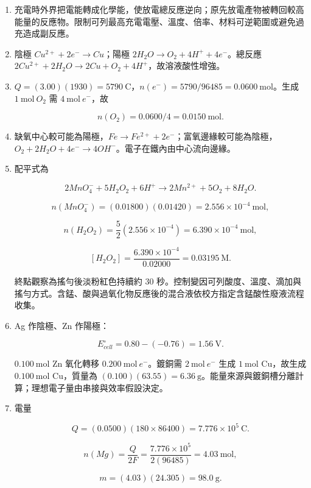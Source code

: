 \documentclass[11pt,a4paper]{article}
\begin{document}
\begin{enumerate}
  \[
  2Fe^{3+}+Cu\rightarrow2Fe^{2+}+Cu^{2+},
  \]

  \[
  E^\circ_{cell}=0.77-0.34=0.43\ \mathrm V.
  \]
\item
  充電時外界把電能轉成化學能，使放電總反應逆向；原先放電產物被轉回較高能量的反應物。限制可列最高充電電壓、溫度、倍率、材料可逆範圍或避免過充造成副反應。
\item
  陰極 \(Cu^{2+}+2e^-\rightarrow Cu\)；陽極 \(2H_2O\rightarrow O_2+4H^++4e^-\)。總反應 \(2Cu^{2+}+2H_2O\rightarrow2Cu+O_2+4H^+\)，故溶液酸性增強。
\item
  \(Q=(3.00)(1930)=5790\ \mathrm C\)，\(n(e^-)=5790/96485=0.0600\ \mathrm{mol}\)。生成 \(1\ \mathrm{mol}\ O_2\) 需 \(4\ \mathrm{mol}\ e^-\)，故

  \[
  n(O_2)=0.0600/4=0.0150\ \mathrm{mol}.
  \]
\item
  缺氧中心較可能為陽極，\(Fe\rightarrow Fe^{2+}+2e^-\)；富氧邊緣較可能為陰極，\(O_2+2H_2O+4e^-\rightarrow4OH^-\)。電子在鐵內由中心流向邊緣。
\item
  配平式為

  \[
  2MnO_4^-+5H_2O_2+6H^+\rightarrow2Mn^{2+}+5O_2+8H_2O.
  \]

  \[
  n(MnO_4^-)=(0.01800)(0.01420)=2.556\times10^{-4}\ \mathrm{mol},
  \]

  \[
  n(H_2O_2)=\frac52(2.556\times10^{-4})=6.390\times10^{-4}\ \mathrm{mol},
  \]

  \[
  [H_2O_2]=\frac{6.390\times10^{-4}}{0.02000}=0.03195\ \mathrm M.
  \]

  終點觀察為搖勻後淡粉紅色持續約 30 秒。控制變因可列酸度、溫度、滴加與搖勻方式。含錳、酸與過氧化物反應後的混合液依校方指定含錳酸性廢液流程收集。
\item
  Ag 作陰極、Zn 作陽極：

  \[
  E^\circ_{cell}=0.80-(-0.76)=1.56\ \mathrm V.
  \]

  \(0.100\ \mathrm{mol}\) Zn 氧化轉移 \(0.200\ \mathrm{mol}\ e^-\)。鍍銅需 \(2\ \mathrm{mol}\ e^-\) 生成 \(1\ \mathrm{mol}\) Cu，故生成 \(0.100\ \mathrm{mol}\) Cu，質量為 \((0.100)(63.55)=6.36\ \mathrm g\)。能量來源與鍍銅槽分離計算；理想電子量由串接與效率假設決定。
\item
  電量

  \[
  Q=(0.0500)(180\times86400)=7.776\times10^5\ \mathrm C.
  \]

  \[
  n(Mg)=\frac{Q}{2F}=\frac{7.776\times10^5}{2(96485)}=4.03\ \mathrm{mol},
  \]

  \[
  m=(4.03)(24.305)=98.0\ \mathrm g.
  \]


\end{enumerate}
\end{document}
